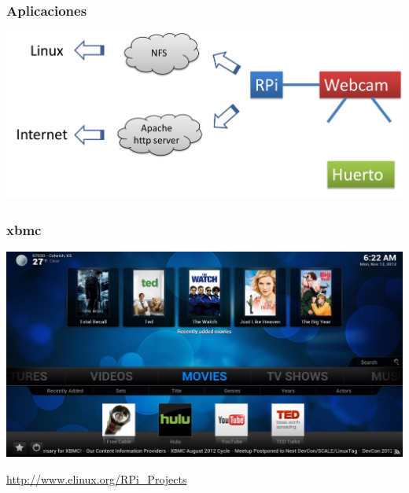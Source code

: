 \documentclass[10pt,colorlinks]{beamer}
\begin{document}
\begin{frame}[fragile]\frametitle{Aplicaciones}

\begin{centering}
    \includegraphics[width=\textwidth]{figs/short}
\end{centering}
\end{frame}


\begin{frame}[fragile]\frametitle{xbmc}

\begin{centering}
    \includegraphics[width=\textwidth]{figs/xbmc}
\end{centering}


\tiny \href{http://www.elinux.org/RPi\_Projects}{http://www.elinux.org/RPi\_Projects}
\end{frame}
\end{document}
